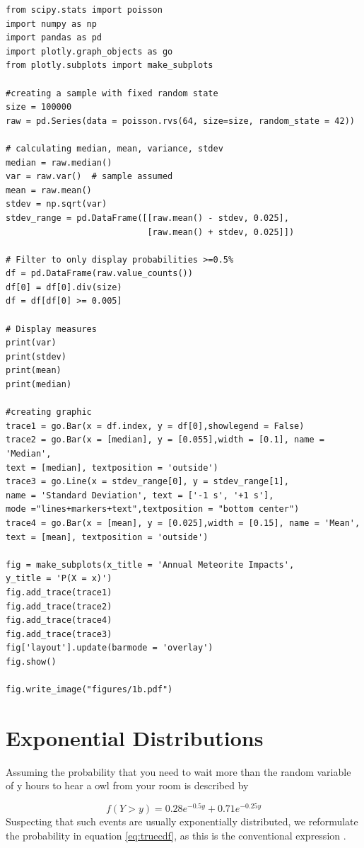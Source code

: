 \begin{lstlisting}
from scipy.stats import poisson
import numpy as np
import pandas as pd
import plotly.graph_objects as go
from plotly.subplots import make_subplots

#creating a sample with fixed random state
size = 100000
raw = pd.Series(data = poisson.rvs(64, size=size, random_state = 42))

# calculating median, mean, variance, stdev
median = raw.median()
var = raw.var()  # sample assumed
mean = raw.mean()
stdev = np.sqrt(var)
stdev_range = pd.DataFrame([[raw.mean() - stdev, 0.025],
                            [raw.mean() + stdev, 0.025]])

# Filter to only display probabilities >=0.5%
df = pd.DataFrame(raw.value_counts())
df[0] = df[0].div(size)
df = df[df[0] >= 0.005]

# Display measures
print(var)
print(stdev)
print(mean)
print(median)

#creating graphic
trace1 = go.Bar(x = df.index, y = df[0],showlegend = False)
trace2 = go.Bar(x = [median], y = [0.055],width = [0.1], name = 'Median', 
text = [median], textposition = 'outside')
trace3 = go.Line(x = stdev_range[0], y = stdev_range[1], 
name = 'Standard Deviation', text = ['-1 s', '+1 s'],
mode ="lines+markers+text",textposition = "bottom center")
trace4 = go.Bar(x = [mean], y = [0.025],width = [0.15], name = 'Mean', 
text = [mean], textposition = 'outside')

fig = make_subplots(x_title = 'Annual Meteorite Impacts',
y_title = 'P(X = x)')
fig.add_trace(trace1)
fig.add_trace(trace2)
fig.add_trace(trace4)
fig.add_trace(trace3)
fig['layout'].update(barmode = 'overlay')
fig.show()

fig.write_image("figures/1b.pdf")
\end{lstlisting}

\section{Exponential Distributions}
Assuming the probability that you need to wait more than the random variable of y hours to hear a owl from your room is described by 

\begin{equation}  f(Y > y) = 0.28e^{-0.5y} + 0.71e^{-0.25y}
\label{eq:initcdf}
\end{equation}
Suspecting that such events are usually exponentially distributed, we reformulate the probability in equation \ref{eq:truecdf}, as this is the conventional expression \cite{deisenroth}. 


